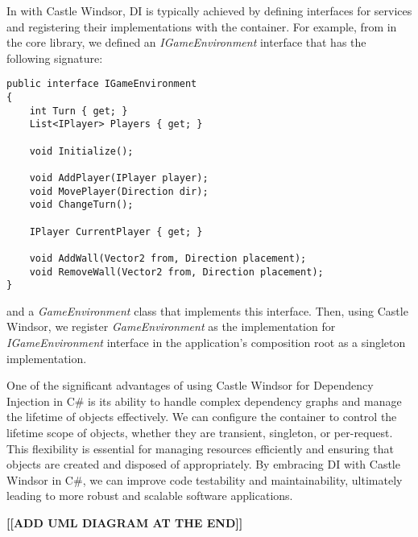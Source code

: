 In with Castle Windsor, DI is typically achieved by defining interfaces for services and registering their implementations with the container. For example, from in the core library, we defined an \textit{IGameEnvironment} interface that has the following signature:

\begin{lstlisting}
public interface IGameEnvironment
{
    int Turn { get; }
    List<IPlayer> Players { get; }

    void Initialize();

    void AddPlayer(IPlayer player);
    void MovePlayer(Direction dir);
    void ChangeTurn();

    IPlayer CurrentPlayer { get; }

    void AddWall(Vector2 from, Direction placement);
    void RemoveWall(Vector2 from, Direction placement);
}
\end{lstlisting}

and a \textit{GameEnvironment} class that implements this interface.
Then, using Castle Windsor, we register \textit{GameEnvironment} as the implementation for \textit{IGameEnvironment} interface in the application's composition root as a singleton implementation.

One of the significant advantages of using Castle Windsor for Dependency Injection in C\# is its ability to handle complex dependency graphs and manage the lifetime of objects effectively. We can configure the container to control the lifetime scope of objects, whether they are transient, singleton, or per-request. This flexibility is essential for managing resources efficiently and ensuring that objects are created and disposed of appropriately. By embracing DI with Castle Windsor in C\#, we can improve code testability and maintainability, ultimately leading to more robust and scalable software applications.

\textbf{[[ADD UML DIAGRAM AT THE END]]}
